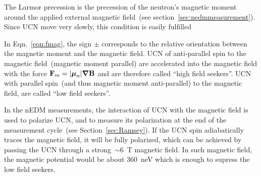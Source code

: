 The Larmor precession is the precession of the neutron's magnetic
moment around the applied external magnetic field~(see
section~\ref{sec:nedmmeasurement}). Since UCN move very slowly, this
condition is easily fulfilled



In Eqn.~\ref{eqn:fmag}, the sign $\pm$ corresponds to the relative
orientation between the magnetic moment and the magnetic field.  UCN
of anti-parallel spin to the magnetic field~(magnetic moment parallel)
are accelerated into the magnetic field with the force
$ {\bf{F}}_m = \vert {\boldsymbol{\mu}}_n \vert \boldsymbol{\nabla}
\bf{B} $ and are therefore called ``high field seekers''. UCN with
parallel spin~(and thus magnetic moment anti-parallel) to the magnetic
field, are called ``low field seekers''.





In the nEDM measurements, the interaction of UCN with the magnetic
field is used to polarize UCN, and to measure its polarization at the
end of the measurement cycle~(see Section~\ref{sec:Ramsey}).  If the
UCN spin adiabatically traces the magnetic field, it will be fully
polarized, which can be achieved by passing the UCN through a
strong~$\sim 6$~T magnetic field. In such magnetic field, the magnetic
potential would be about 360~neV which is enough to supress the low
field seekers.



